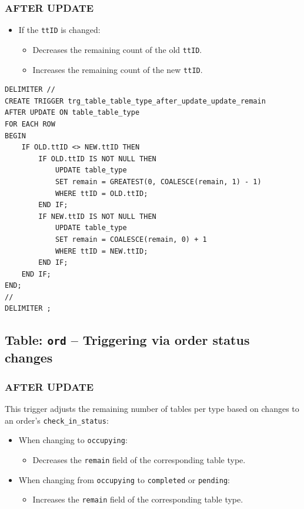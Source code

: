 \documentclass[12pt]{article}
\begin{document}
\subsubsection*{AFTER UPDATE}
\begin{itemize}
    \item If the \texttt{ttID} is changed:
    \begin{itemize}
        \item Decreases the remaining count of the old \texttt{ttID}.
        \item Increases the remaining count of the new \texttt{ttID}.
    \end{itemize}
\end{itemize}
\begin{lstlisting}
DELIMITER //
CREATE TRIGGER trg_table_table_type_after_update_update_remain
AFTER UPDATE ON table_table_type
FOR EACH ROW
BEGIN
    IF OLD.ttID <> NEW.ttID THEN
        IF OLD.ttID IS NOT NULL THEN
            UPDATE table_type
            SET remain = GREATEST(0, COALESCE(remain, 1) - 1)
            WHERE ttID = OLD.ttID;
        END IF;
        IF NEW.ttID IS NOT NULL THEN
            UPDATE table_type
            SET remain = COALESCE(remain, 0) + 1
            WHERE ttID = NEW.ttID;
        END IF;
    END IF;
END;
//
DELIMITER ;
\end{lstlisting}

\subsection*{Table: \texttt{ord} -- Triggering via order status changes}

\subsubsection*{AFTER UPDATE}
This trigger adjusts the remaining number of tables per type based on changes to an order's \texttt{check\_in\_status}:

\begin{itemize}
    \item When changing to \texttt{occupying}:
    \begin{itemize}
        \item Decreases the \texttt{remain} field of the corresponding table type.
    \end{itemize}
    \item When changing from \texttt{occupying} to \texttt{completed} or \texttt{pending}:
    \begin{itemize}
        \item Increases the \texttt{remain} field of the corresponding table type.
    \end{itemize}
\end{itemize}
\end{document}
